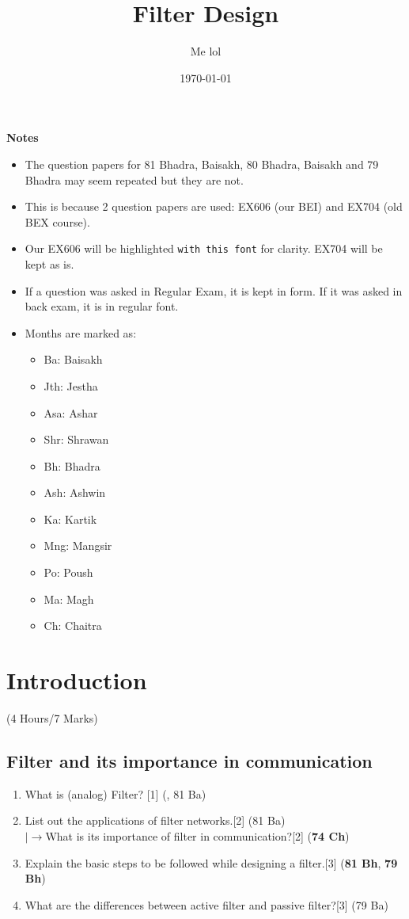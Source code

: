 \documentclass[12pt]{article}
\title{Filter Design}
\author{Me lol}
\date{\today}
\newcommand{\lb}{\\$\left|\rightarrow\right.$}
\begin{document}
\maketitle
\vspace{8cm}
\textbf{Notes}
\begin{itemize}
	\item The question papers for 81 Bhadra, Baisakh, 80 Bhadra, Baisakh and 79 Bhadra may seem repeated but they are not.
	\item This is because 2 question papers are used: EX606 (our BEI) and EX704 (old BEX course).
	\item Our EX606 will be highlighted \texttt{with this font} for clarity. EX704 will be kept as is.
	\item If a question was asked in Regular Exam, it is kept in  form. If it was asked in back exam, it is in regular font.
	\item Months are marked as: 
	\begin{itemize}[noitemsep, topsep=0pt]
		\item Ba: Baisakh
		\item Jth: Jestha
		\item Asa: Ashar
		\item Shr: Shrawan
		\item Bh: Bhadra
		\item Ash: Ashwin
		\item Ka: Kartik
		\item Mng: Mangsir
		\item Po: Poush
		\item Ma: Magh
		\item Ch: Chaitra
	\end{itemize}
\end{itemize}
\pagebreak
\tableofcontents
\pagebreak

\section{Introduction}
	\begin{center}(4 Hours/7 Marks)\end{center}
	\subsection{Filter and its importance in communication}
		\begin{enumerate}
			\item What is (analog) Filter? \hfill [1] (, 81 Ba)
			\item List out the applications of filter networks.\hfill[2] (81 Ba)
			\lb What is its importance of filter in communication?\hfill[2] (\textbf{74 Ch})
			\item Explain the basic steps to be followed while designing a filter.\hfill[3] (\textbf{81 Bh}, \textbf{79 Bh})
			\item What are the differences between active filter and passive filter?\hfill[3] (79 Ba)
		\end{enumerate}
		
\end{document}
